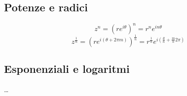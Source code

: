 \subsection{Potenze e radici}
\begin{equation}
  z^n = \left( r e^{i\theta} \right)^n = r^n e^{i n\theta}
\end{equation}
\begin{equation}
  z^{\frac{1}{n}} = \left( r e^{i(\theta + 2\pi m)} \right)^{\frac{1}{n}} = r^{\frac{1}{n}} e^{i\left(\frac{\theta}{n} + \frac{m}{n} 2 \pi \right)}
\end{equation}

\subsection{Esponenziali e logaritmi}
\dots
